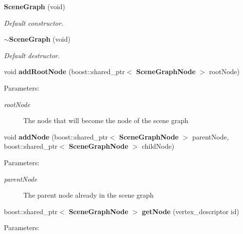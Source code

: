 \begin{CompactItemize}
\item 
{\bf SceneGraph} (void)
\begin{CompactList}\small\item\em Default constructor. \item\end{CompactList}\item 
{\bf $\sim$SceneGraph} (void)
\begin{CompactList}\small\item\em Default destructor. \item\end{CompactList}\item 
void {\bf addRootNode} (boost::shared\_\-ptr$<$ {\bf SceneGraphNode} $>$ rootNode)
\begin{CompactList}\small\item\em \begin{Desc}
\item[Parameters:]
\begin{description}
\item[{\em rootNode}]The node that will become the node of the scene graph \end{description}
\end{Desc}
\item\end{CompactList}\item 
void {\bf addNode} (boost::shared\_\-ptr$<$ {\bf SceneGraphNode} $>$ parentNode, boost::shared\_\-ptr$<$ {\bf SceneGraphNode} $>$ childNode)
\begin{CompactList}\small\item\em \begin{Desc}
\item[Parameters:]
\begin{description}
\item[{\em parentNode}]The parent node already in the scene graph \end{description}
\end{Desc}
\item\end{CompactList}\item 
boost::shared\_\-ptr$<$ {\bf SceneGraphNode} $>$ {\bf getNode} (vertex\_\-descriptor id)
\begin{CompactList}\small\item\em \begin{Desc}
\item[Parameters:]
\begin{description}

\end{description}
\end{Desc}
\end{CompactList}
\end{CompactItemize}
